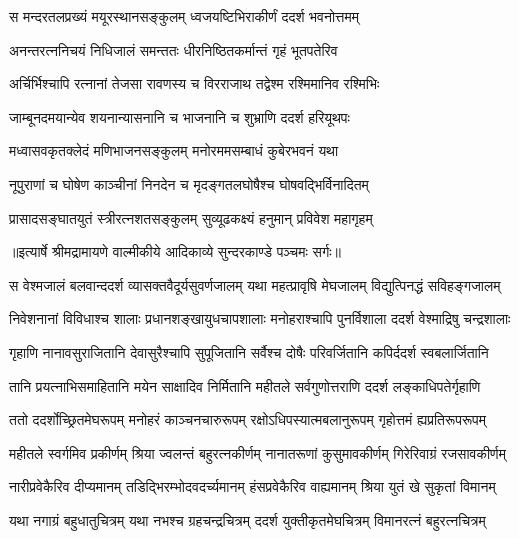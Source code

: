 \twolineshloka
{स मन्दरतलप्रख्यं मयूरस्थानसङ्कुलम्}
{ध्वजयष्टिभिराकीर्णं ददर्श भवनोत्तमम्} %

\twolineshloka
{अनन्तरत्ननिचयं निधिजालं समन्ततः}
{धीरनिष्ठितकर्मान्तं गृहं भूतपतेरिव} %

\twolineshloka
{अर्चिर्भिश्चापि रत्नानां तेजसा रावणस्य च}
{विरराजाथ तद्वेश्म रश्मिमानिव रश्मिभिः} %

\twolineshloka
{जाम्बूनदमयान्येव शयनान्यासनानि च}
{भाजनानि च शुभ्राणि ददर्श हरियूथपः} %

\twolineshloka
{मध्वासवकृतक्लेदं मणिभाजनसङ्कुलम्}
{मनोरममसम्बाधं कुबेरभवनं यथा} %

\twolineshloka
{नूपुराणां च घोषेण काञ्चीनां निनदेन च}
{मृदङ्गतलघोषैश्च घोषवद्भिर्विनादितम्} %

\twolineshloka
{प्रासादसङ्घातयुतं स्त्रीरत्नशतसङ्कुलम्}
{सुव्यूढकक्ष्यं हनुमान् प्रविवेश महागृहम्} %


{॥इत्यार्षे श्रीमद्रामायणे वाल्मीकीये आदिकाव्ये सुन्दरकाण्डे पञ्चमः सर्गः॥}


\fourlineindentedshloka
{स वेश्मजालं बलवान्ददर्श}
{व्यासक्तवैदूर्यसुवर्णजालम्}
{यथा महत्प्रावृषि मेघजालम्}
{विद्युत्पिनद्धं सविहङ्गजालम्} %

\fourlineindentedshloka
{निवेशनानां विविधाश्च शालाः}
{प्रधानशङ्खायुधचापशालाः}
{मनोहराश्चापि पुनर्विशाला}
{ददर्श वेश्माद्रिषु चन्द्रशालाः} %

\fourlineindentedshloka
{गृहाणि नानावसुराजितानि}
{देवासुरैश्चापि सुपूजितानि}
{सर्वैश्च दोषैः परिवर्जितानि}
{कपिर्ददर्श स्वबलार्जितानि} %

\fourlineindentedshloka
{तानि प्रयत्नाभिसमाहितानि}
{मयेन साक्षादिव निर्मितानि}
{महीतले सर्वगुणोत्तराणि}
{ददर्श लङ्काधिपतेर्गृहाणि} %

\fourlineindentedshloka
{ततो ददर्शोच्छ्रितमेघरूपम्}
{मनोहरं काञ्चनचारुरूपम्}
{रक्षोऽधिपस्यात्मबलानुरूपम्}
{गृहोत्तमं ह्यप्रतिरूपरूपम्} %

\fourlineindentedshloka
{महीतले स्वर्गमिव प्रकीर्णम्}
{श्रिया ज्वलन्तं बहुरत्नकीर्णम्}
{नानातरूणां कुसुमावकीर्णम्}
{गिरेरिवाग्रं रजसावकीर्णम्} %

\fourlineindentedshloka
{नारीप्रवेकैरिव दीप्यमानम्}
{तडिद्भिरम्भोदवदर्च्यमानम्}
{हंसप्रवेकैरिव वाह्यमानम्}
{श्रिया युतं खे सुकृतां विमानम्} %

\fourlineindentedshloka
{यथा नगाग्रं बहुधातुचित्रम्}
{यथा नभश्च ग्रहचन्द्रचित्रम्}
{ददर्श युक्तीकृतमेघचित्रम्}
{विमानरत्नं बहुरत्नचित्रम्} %

